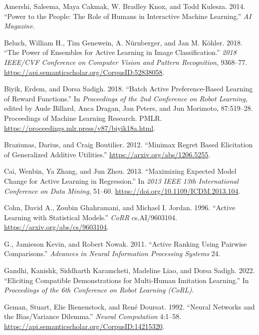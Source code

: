 \documentclass[
  letterpaper,
  numbers=noenddot,
  DIV=11]{scrreprt}
\newlength{\cslhangindent}
\newenvironment{CSLReferences}[2] %
 {\begin{list}{}{%
  \setlength{\itemindent}{0pt}
  \setlength{\leftmargin}{0pt}
  \setlength{\parsep}{0pt}
  \ifodd #1
   \setlength{\leftmargin}{\cslhangindent}
   \setlength{\itemindent}{-1\cslhangindent}
  \fi
  \setlength{\itemsep}{#2\baselineskip}}}
 {\end{list}}
\theoremstyle{plain}
\theoremstyle{definition}
\theoremstyle{remark}
\begin{document}

\label{refs-3}
\begin{CSLReferences}{1}{0}
Amershi, Saleema, Maya Cakmak, W. Bradley Knox, and Todd Kulesza. 2014.
{``Power to the People: The Role of Humans in Interactive Machine
Learning.''} \emph{AI Magazine}.

Beluch, William H., Tim Genewein, A. Nürnberger, and Jan M. Köhler.
2018. {``The Power of Ensembles for Active Learning in Image
Classification.''} \emph{2018 IEEE/CVF Conference on Computer Vision and
Pattern Recognition}, 9368--77.
\url{https://api.semanticscholar.org/CorpusID:52838058}.

Biyik, Erdem, and Dorsa Sadigh. 2018. {``Batch Active Preference-Based
Learning of Reward Functions.''} In \emph{Proceedings of the 2nd
Conference on Robot Learning}, edited by Aude Billard, Anca Dragan, Jan
Peters, and Jun Morimoto, 87:519--28. Proceedings of Machine Learning
Research. PMLR. \url{https://proceedings.mlr.press/v87/biyik18a.html}.

Braziunas, Darius, and Craig Boutilier. 2012. {``Minimax Regret Based
Elicitation of Generalized Additive Utilities.''}
\url{https://arxiv.org/abs/1206.5255}.

Cai, Wenbin, Ya Zhang, and Jun Zhou. 2013. {``Maximizing Expected Model
Change for Active Learning in Regression.''} In \emph{2013 IEEE 13th
International Conference on Data Mining}, 51--60.
\url{https://doi.org/10.1109/ICDM.2013.104}.

Cohn, David A., Zoubin Ghahramani, and Michael I. Jordan. 1996.
{``Active Learning with Statistical Models.''} \emph{CoRR}
cs.AI/9603104. \url{https://arxiv.org/abs/cs/9603104}.

G., Jamieson Kevin, and Robert Nowak. 2011. {``Active Ranking Using
Pairwise Comparisons.''} \emph{Advances in Neural Information Processing
Systems} 24.

Gandhi, Kanishk, Siddharth Karamcheti, Madeline Liao, and Dorsa Sadigh.
2022. {``Eliciting Compatible Demonstrations for Multi-Human Imitation
Learning.''} In \emph{Proceedings of the 6th Conference on Robot
Learning (CoRL)}.

Geman, Stuart, Elie Bienenstock, and René Doursat. 1992. {``Neural
Networks and the Bias/Variance Dilemma.''} \emph{Neural Computation}
4:1--58. \url{https://api.semanticscholar.org/CorpusID:14215320}.


\end{CSLReferences}
\end{document}
